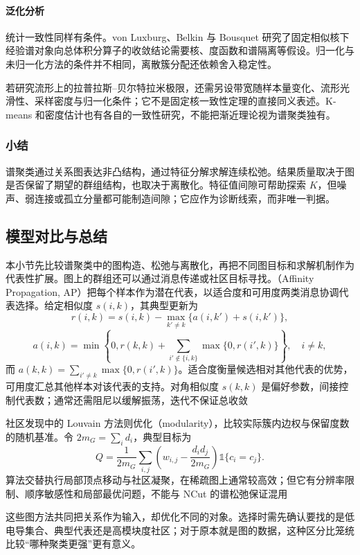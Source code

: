 \paragraph{泛化分析}
统计一致性同样有条件。von Luxburg、Belkin 与 Bousquet 研究了固定相似核下经验谱对象向总体积分算子的收敛结论需要核、度函数和谱隔离等假设。归一化与未归一化方法的条件并不相同，离散簇分配还依赖舍入稳定性。

若研究流形上的拉普拉斯--贝尔特拉米极限，还需另设带宽随样本量变化、流形光滑性、采样密度与归一化条件；它不是固定核一致性定理的直接同义表述。K-means 和密度估计也有各自的一致性研究，不能把渐近理论视为谱聚类独有。

\subsubsection{小结}

谱聚类通过关系图表达非凸结构，通过特征分解求解连续松弛。结果质量取决于图是否保留了期望的群组结构，也取决于离散化。特征值间隙可帮助探索 $K$，但噪声、弱连接或孤立分量都可能制造间隙；它应作为诊断线索，而非唯一判据。

\subsection{模型对比与总结}

本小节先比较谱聚类中的图构造、松弛与离散化，再把不同图目标和求解机制作为代表性扩展。图上的群组还可以通过消息传递或社区目标寻找。（Affinity Propagation, AP）把每个样本作为潜在代表，以适合度和可用度两类消息协调代表选择。给定相似度 $s(i,k)$，其典型更新为
\[
 r(i,k)=s(i,k)-\max_{k'\ne k}\{a(i,k')+s(i,k')\},
\]
\[
 a(i,k)=
 \min\left\{0,r(k,k)+
 \sum_{i'\notin\{i,k\}}\max\{0,r(i',k)\}\right\},
 \quad i\ne k,
\]
而 $a(k,k)=\sum_{i'\ne k}\max\{0,r(i',k)\}$。适合度衡量候选相对其他代表的优势，可用度汇总其他样本对该代表的支持。对角相似度 $s(k,k)$ 是偏好参数，间接控制代表数；通常还需阻尼以缓解振荡，迭代不保证总收敛

社区发现中的 Louvain 方法则优化（modularity），比较实际簇内边权与保留度数的随机基准。令 $2m_G=\sum_i d_i$，典型目标为
\[
 Q=\frac{1}{2m_G}\sum_{i,j}
 \left(w_{i,j}-\frac{d_i d_j}{2m_G}\right)
 \mathbb{1}\{c_i=c_j\}.
\]
算法交替执行局部顶点移动与社区凝聚，在稀疏图上通常较高效；但它有分辨率限制、顺序敏感性和局部最优问题，不能与 NCut 的谱松弛保证混用

这些图方法共同把关系作为输入，却优化不同的对象。选择时需先确认要找的是低电导集合、典型代表还是高模块度社区；对于原本就是图的数据，这种区分比笼统比较“哪种聚类更强”更有意义。

